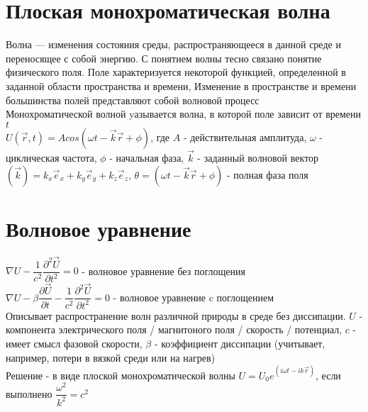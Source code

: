 \newcommand{\colontitulAutors}{astronom\_v\_cube}
\newcommand{\colontitulYear}{2023~}
\newcommand{\colontitulEducationalSubject}{Физика волновых процессов}
\newcommand{\colontitulTeacher}{Петров Е. Ю.}




	\small
	\begin{multicols*}{2}

		\section{Плоская монохроматическая волна}
		Волна — изменения состояния среды, распространяющееся в данной среде и переносящее с собой энергию. С понятием волны тесно связано понятие физического поля. Поле характеризуется некоторой функцией, определенной в заданной области пространства и времени, Изменение в пространстве и времени большинства полей представляют собой волновой процесс\\
		Монохроматической волной yазывается волна, в которой поле зависит от времени $t$\\
		$U(\vec{r}, t) = A cos(\omega t - \vec{k} \vec{r} + \phi)$, где $A$ - действительная амплитуда, $\omega$ - циклическая частота, $\phi$ - начальная фаза, $\vec{k}$ - заданный волновой вектор $(\vec{k}) = k_x \vec{e}_x + k_y \vec{e}_y + k_z \vec{e}_z$, $\theta = (\omega t - \vec{k} \vec{r} + \phi)$ - полная фаза поля

		\section{Волновое уравнение}
		$\nabla U - \dfrac{1}{c^2} \dfrac{\partial^2 \vec{U}}{\partial t^2} = 0$ - волновое уравнение без поглощения\\
		$\nabla U - \beta\dfrac{\partial\vec{U}}{\partial t} -\dfrac{1}{c^2} \dfrac{\partial^2 \vec{U}}{\partial t^2} = 0$ - волновое уравнение c поглощением\\
		Описывает распространение волн различной природы в среде без диссипации. 
		$U$ - компонента электрического поля / магнитоного поля / скорость / потенциал, $c$ - имеет смысл фазовой скорости, $\beta$ - коэффициент диссипации (учитывает, например, потери в вязкой среди или на нагрев)\\
		Решение - в виде плоской монохроматической волны $U = U_0 e^{(i\omega t - i k \vec{r})}$, если выполнено $\dfrac{\omega^2}{k^2} = c^2$


\end{multicols*}
